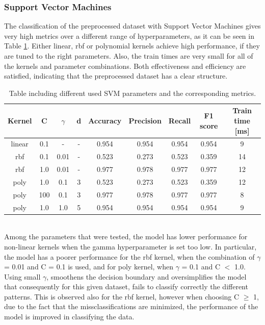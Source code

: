 \documentclass{article}
\begin{document}
\subsubsection*{Support Vector Machines}
The classification of the preprocessed dataset with Support Vector Machines gives very high metrics over a different range of hyperparameters, as it can be seen in Table \ref{table:votings_SVM}. Either linear, rbf or polynomial kernels achieve high performance, if they are tuned to the right parameters. Also, the train times are very small for all of the kernels and parameter combinations. Both effectiveness and efficiency are satisfied, indicating that the preprocessed dataset has a clear structure.
\begin{table}[h!]
\centering
\begin{tabular}{||c c c c c c c c c||} 
 \hline
 Kernel & C & $\gamma$ &d & Accuracy & Precision & Recall & F1 score & Train time [ms] \\ [0.5ex] 
 \hline\hline
 linear & 0.1 & - & - & 0.954 & 0.954 & 0.954 & 0.954 & 9 \\  
 rbf & 0.1 & 0.01 & - & 0.523 & 0.273 & 0.523 & 0.359 & 14 \\
 rbf & 1.0 & 0.01 & - & 0.977 & 0.978 & 0.977 & 0.977 & 12\\
 poly & 1.0 &  0.1 & 3 & 0.523 & 0.273 & 0.523 & 0.359 & 12 \\
 poly & 100 &  0.1 & 3 & 0.977 & 0.978 & 0.977 & 0.977 & 8 \\
 poly &  1.0&  1.0 & 5& 0.954 & 0.954 & 0.954 & 0.954 & 9 \\ [1ex] 
 \hline
\end{tabular}
\caption{Table including different used SVM parameters and the corresponding metrics.}
\label{table:votings_SVM}
\end{table}
\\
Among the parameters that were tested, the model has lower performance for non-linear kernels when the gamma hyperparameter is set too low. In particular, the model has a poorer performance for the rbf kernel, when the combination of $\gamma$ = 0.01 and C = 0.1 is used, and for poly kernel, when $\gamma$ = 0.1 and C $<$ 1.0. Using small $\gamma$, smoothens the decision boundary and oversimplifies the model that consequently for this given dataset, fails to classify correctly the different patterns. This is observed also for the rbf kernel, however when choosing C $\ge$ 1, due to the fact that the missclassifications are minimized, the performance of the model is improved in classifying the data. 
\end{document}
